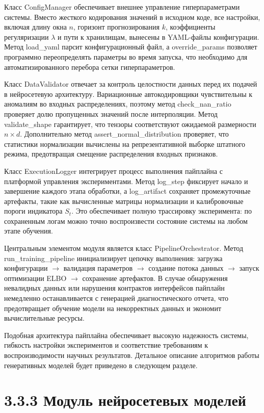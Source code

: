 \documentclass[14pt, a4paper, oneside]{extreport}
\begin{document}
Класс {ConfigManager} обеспечивает внешнее управление гиперпараметрами системы. Вместо жесткого кодирования значений в исходном коде, все настройки, включая длину окна $n$, горизонт прогнозирования $k$, коэффициенты регуляризации $\lambda$ и пути к хранилищам, вынесены в YAML-файлы конфигурации. Метод {load\_yaml} парсит конфигурационный файл, а {override\_params} позволяет программно переопределять параметры во время запуска, что необходимо для автоматизированного перебора сетки гиперпараметров.

Класс {DataValidator} отвечает за контроль целостности данных перед их подачей в нейросетевую архитектуру. Вариационные автокодировщики чувствительны к аномалиям во входных распределениях, поэтому метод {check\_nan\_ratio} проверяет долю пропущенных значений после интерполяции. Метод {validate\_shape} гарантирует, что тензоры соответствуют ожидаемой размерности $n \times d$. Дополнительно метод {assert\_normal\_distribution} проверяет, что статистики нормализации вычислены на репрезентативной выборке штатного режима, предотвращая смещение распределения входных признаков.

Класс {ExecutionLogger} интегрирует процесс выполнения пайплайна с платформой управления экспериментами. Метод {log\_step} фиксирует начало и завершение каждого этапа обработки, а {log\_artifact} сохраняет промежуточные артефакты, такие как вычисленные матрицы нормализации и калибровочные пороги индикатора $S_t$. Это обеспечивает полную трассировку эксперимента: по сохраненным логам можно точно воспроизвести состояние системы на любом этапе обучения.

Центральным элементом модуля является класс {PipelineOrchestrator}. Метод {run\_training\_pipeline} инициализирует цепочку выполнения: загрузка конфигурации $\to$ валидация параметров $\to$ создание потока данных $\to$ запуск оптимизации ELBO $\to$ сохранение артефактов. В случае обнаружения невалидных данных или нарушения контрактов интерфейсов пайплайн немедленно останавливается с генерацией диагностического отчета, что предотвращает обучение модели на некорректных данных и экономит вычислительные ресурсы.

Подобная архитектура пайплайна обеспечивает высокую надежность системы, гибкость настройки экспериментов и соответствие требованиям к воспроизводимости научных результатов. Детальное описание алгоритмов работы генеративных моделей будет приведено в следующем разделе.


\vspace{1em}
\section{3.3.3 Модуль нейросетевых моделей}
\vspace{1em}
\end{document}
